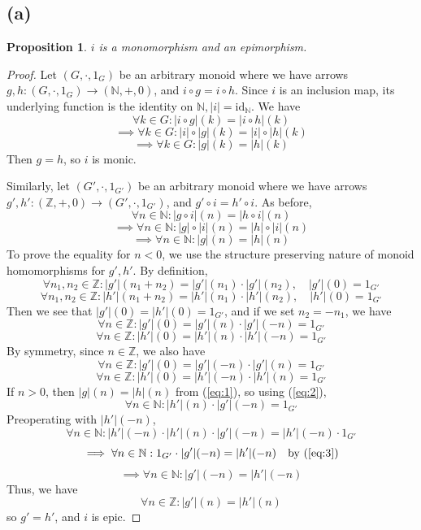 \documentclass[11pt]{article} %
\newtheorem{proposition}[theorem]{Proposition}
\theoremstyle{definition}
\begin{document}
\subsection*{(a)}
\begin{proposition}
    $i$ is a monomorphism and an epimorphism.
\end{proposition}
\begin{proof}
    Let $(G,\cdot,1_G)$ be an arbitrary monoid where we have arrows $g,h:(G,\cdot,1_G)\rightarrow(\mathbb{N},+,0)$,
    and $i\circ g=i\circ h$.
    Since $i$ is an inclusion map, its underlying function is the identity on $\mathbb{N},|i|=\text{id}_\mathbb{N}$.
    We have
    \[\forall k\in G:|i\circ g|(k)=|i\circ h|(k)\]
    \[\implies\forall k\in G:|i| \circ |g|(k)=|i|\circ |h|(k)\]
    \[\implies\forall k\in G: |g|(k)= |h|(k)\]
    Then $g=h$, so $i$ is monic.

    Similarly, let $(G',\cdot,1_{G'})$ be an arbitrary monoid 
    where we have arrows $g',h':(\mathbb{Z},+,0)\rightarrow(G',\cdot,1_{G'})$,
    and $g'\circ i=h'\circ i$. 
    As before,
    \[\forall n\in \mathbb{N}:|g\circ i|(n)=|h\circ i|(n)\]
    \[\implies\forall n\in \mathbb{N}:|g| \circ |i|(n)=|h|\circ |i|(n)\]
    \begin{equation}
        \implies\forall n\in \mathbb{N}: |g|(n)= |h|(n)
        \label{eq:1}
    \end{equation}
    To prove the equality for $n<0$, we use the structure preserving nature of monoid homomorphisms for $g',h'$.
    By definition,
    \[\forall n_1,n_2\in\mathbb{Z}:|g'|(n_1+n_2)=|g'|(n_1)\cdot |g'|(n_2),\quad |g'|(0)=1_{G'}\]
    \[\forall n_1,n_2\in\mathbb{Z}:|h'|(n_1+n_2)=|h'|(n_1)\cdot |h'|(n_2),\quad |h'|(0)=1_{G'}\]
    Then we see that $|g'|(0)=|h'|(0)=1_{G'}$, and if we set $n_2=-n_1$, we have
    \begin{equation}
        \forall n\in\mathbb{Z}:|g'|(0)=|g'|(n)\cdot |g'|(-n)=1_{G'}
        \label{eq:2}
    \end{equation}
    \[\forall n\in\mathbb{Z}:|h'|(0)=|h'|(n)\cdot |h'|(-n)=1_{G'}\]
    By symmetry, since $n\in\mathbb{Z}$, we also have 
    \[\forall n\in\mathbb{Z}:|g'|(0)=|g'|(-n)\cdot |g'|(n)=1_{G'}\]
    \begin{equation}
        \forall n\in\mathbb{Z}:|h'|(0)=|h'|(-n)\cdot |h'|(n)=1_{G'}
        \label{eq:3}
    \end{equation}
    \[\]
    If $n>0$, then $|g|(n)= |h|(n)$ from (\ref{eq:1}), so using (\ref{eq:2}),
    \[\forall n\in\mathbb{N}:|h'|(n)\cdot |g'|(-n)=1_{G'}\]
    Preoperating with $|h'|(-n)$,
    \[\forall n\in\mathbb{N}:|h'|(-n)\cdot |h'|(n)\cdot |g'|(-n)=|h'|(-n)\cdot 1_{G'}\]
    \[\implies \forall n\in\mathbb{N}:1_{G'}\cdot |g'|(-n)=|h'|(-n) \quad\text{by (\ref{eq:3})}\]
    \[\implies \forall n\in\mathbb{N}:|g'|(-n)=|h'|(-n)\]
    Thus, we have
    \[\forall n\in\mathbb{Z}:|g'|(n)=|h'|(n)\]
    so $g'=h'$, and $i$ is epic.
\end{proof}
\end{document}
